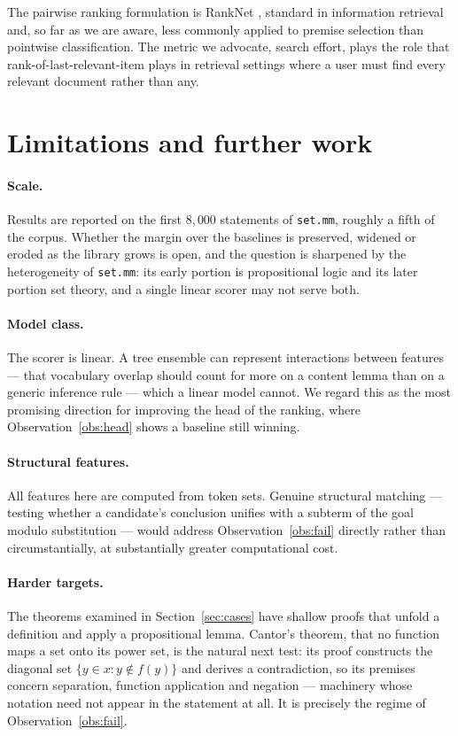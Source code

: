 \documentclass[11pt]{article}
\theoremstyle{plain}
\theoremstyle{definition}
\theoremstyle{remark}
\begin{document}
The pairwise ranking formulation is RankNet \cite{burges}, standard in
information retrieval and, so far as we are aware, less commonly applied to
premise selection than pointwise classification. The metric we advocate, search
effort, plays the role that rank-of-last-relevant-item plays in retrieval
settings where a user must find every relevant document rather than any.

\section{Limitations and further work}\label{sec:limits}

\paragraph{Scale.} Results are reported on the first $8{,}000$ statements of
\texttt{set.mm}, roughly a fifth of the corpus. Whether the margin over the
baselines is preserved, widened or eroded as the library grows is open, and the
question is sharpened by the heterogeneity of \texttt{set.mm}: its early portion
is propositional logic and its later portion set theory, and a single linear
scorer may not serve both.

\paragraph{Model class.} The scorer is linear. A tree ensemble can represent
interactions between features --- that vocabulary overlap should count for more
on a content lemma than on a generic inference rule --- which a linear model
cannot. We regard this as the most promising direction for improving the head of
the ranking, where Observation~\ref{obs:head} shows a baseline still winning.

\paragraph{Structural features.} All features here are computed from token sets.
Genuine structural matching --- testing whether a candidate's conclusion unifies
with a subterm of the goal modulo substitution --- would address
Observation~\ref{obs:fail} directly rather than circumstantially, at
substantially greater computational cost.

\paragraph{Harder targets.} The theorems examined in Section~\ref{sec:cases} have
shallow proofs that unfold a definition and apply a propositional lemma. Cantor's
theorem, that no function maps a set onto its power set, is the natural next
test: its proof constructs the diagonal set $\{y\in x : y\notin f(y)\}$ and
derives a contradiction, so its premises concern separation, function application
and negation --- machinery whose notation need not appear in the statement at
all. It is precisely the regime of Observation~\ref{obs:fail}.
\end{document}
